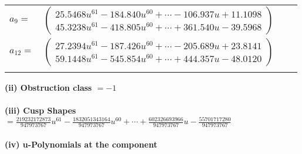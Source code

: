 \documentclass[1p]{elsarticle_modified}
\theoremstyle{definition}
\begin{document}
\begin{tabular}{m{7pt} m{180pt} m{7pt} m{180pt} }
\flushright $a_{9}=$&$\begin{pmatrix}25.5468 u^{61}-184.840 u^{60}+\cdots-106.937 u+11.1098\\45.3238 u^{61}-418.805 u^{60}+\cdots+361.540 u-39.5968\end{pmatrix}$ \\
\flushright $a_{12}=$&$\begin{pmatrix}27.2394 u^{61}-187.426 u^{60}+\cdots-205.689 u+23.8141\\59.1448 u^{61}-545.854 u^{60}+\cdots+444.357 u-48.0120\end{pmatrix}$\\&\end{tabular}
\flushleft \textbf{(ii) Obstruction class $= -1$}\\~\\
\flushleft \textbf{(iii) Cusp Shapes $= \frac{219232172873}{947973767} u^{61}-\frac{1832051343164}{947973767} u^{60}+\cdots+\frac{602326693966}{947973767} u-\frac{55701717280}{947973767}$}\\~\\
\newpage\renewcommand{\arraystretch}{1}
\flushleft \textbf{(iv) u-Polynomials at the component}\newline \\
\end{document}
